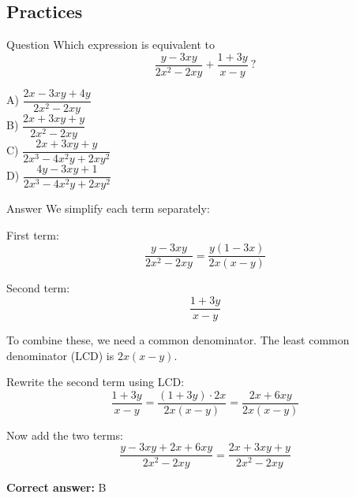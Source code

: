 \documentclass{beamer}
\begin{document}
\begin{frame}
\section{Practices}
\end{frame}

\begin{frame}{Question}
Which expression is equivalent to
\[
\frac{y - 3xy}{2x^2 - 2xy} + \frac{1 + 3y}{x - y}\ ?
\]

A) $\dfrac{2x - 3xy + 4y}{2x^2 - 2xy}$ \\
B) $\dfrac{2x + 3xy + y}{2x^2 - 2xy}$ \\
C) $\dfrac{2x + 3xy + y}{2x^3 - 4x^2y + 2xy^2}$ \\
D) $\dfrac{4y - 3xy + 1}{2x^3 - 4x^2y + 2xy^2}$
\end{frame}


\begin{frame}{Answer}
We simplify each term separately:

First term:
\[
\frac{y - 3xy}{2x^2 - 2xy} = \frac{y(1 - 3x)}{2x(x - y)}
\]

Second term:
\[
\frac{1 + 3y}{x - y}
\]

To combine these, we need a common denominator. The least common denominator (LCD) is $2x(x - y)$.

Rewrite the second term using LCD:
\[
\frac{1 + 3y}{x - y} = \frac{(1 + 3y) \cdot 2x}{2x(x - y)} = \frac{2x + 6xy}{2x(x - y)}
\]

Now add the two terms:
\[
\frac{y - 3xy + 2x + 6xy}{2x^2 - 2xy} = \frac{2x + 3xy + y}{2x^2 - 2xy}
\]

\textbf{Correct answer:} B
\end{frame}
\end{document}
